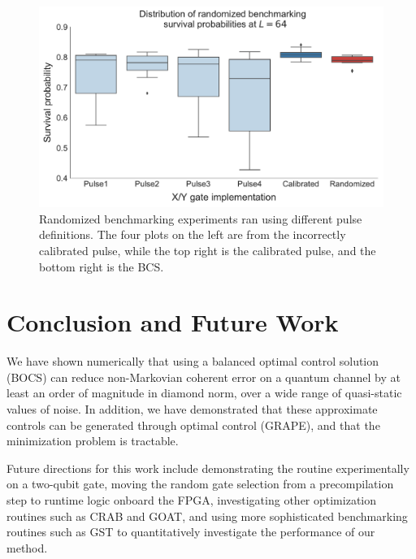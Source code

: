 \documentclass[aps,nofootinbib,pra,notitlepage,twocolumn]{revtex4-1}
\begin{document}
\begin{figure}[H]
  \centering
  \includegraphics[width=\columnwidth]{rb_data.pdf}
  \caption{Randomized benchmarking experiments ran using different pulse definitions. The four plots on the left are from the incorrectly calibrated pulse, while the top right is the calibrated pulse, and the bottom right is the BCS.}
  \label{fig:rb}
\end{figure}

\section{Conclusion and Future Work}
We have shown numerically that using a balanced optimal control solution (BOCS) can reduce non-Markovian coherent error on a quantum channel by at least an order of magnitude in diamond norm, over a wide range of quasi-static values of noise. In addition, we have demonstrated that these approximate controls can be generated through optimal control (GRAPE), and that the minimization problem is tractable. 


Future directions for this work include demonstrating the routine experimentally on a two-qubit gate, moving the random gate selection from a precompilation step to runtime logic onboard the FPGA, investigating other optimization routines such as CRAB \cite{Caneva2011} and GOAT\cite{Machnes2018}, and using more sophisticated benchmarking routines such as GST\cite{BlumeKohout2017} to quantitatively investigate the performance of our method. 
\end{document}
